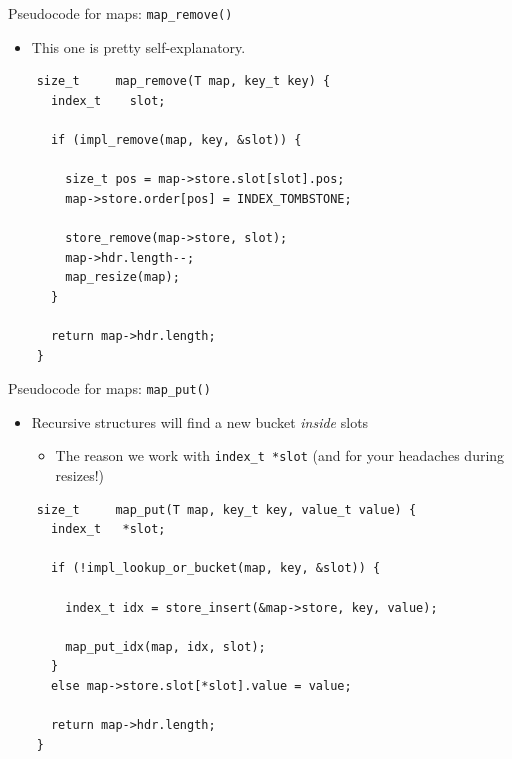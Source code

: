 \begin{frame}[fragile]{Pseudocode for maps: \lstinline{map_remove()}}

  \begin{itemize}
  \item This one is pretty self-explanatory.
  \end{itemize}
  
  \begin{lstlisting}
    size_t     map_remove(T map, key_t key) {
      index_t    slot;
      
      if (impl_remove(map, key, &slot)) {

        size_t pos = map->store.slot[slot].pos;
        map->store.order[pos] = INDEX_TOMBSTONE;

        store_remove(map->store, slot);
        map->hdr.length--;
        map_resize(map);
      }
      
      return map->hdr.length;
    }
  \end{lstlisting}

\end{frame}


\begin{frame}[fragile]{Pseudocode for maps: \lstinline{map_put()}}

  \begin{itemize}
  \item Recursive structures will find a new bucket {\em inside} slots
    \begin{itemize}
    \item The reason we work with \lstinline{index_t *slot} (and for your headaches during resizes!)
    \end{itemize}
  \end{itemize}

  \begin{lstlisting}
    size_t     map_put(T map, key_t key, value_t value) {
      index_t   *slot;

      if (!impl_lookup_or_bucket(map, key, &slot)) {
        
        index_t idx = store_insert(&map->store, key, value);

        map_put_idx(map, idx, slot);
      }
      else map->store.slot[*slot].value = value;

      return map->hdr.length;
    }
  \end{lstlisting}

\end{frame}



